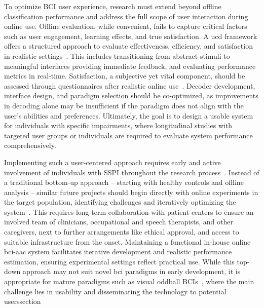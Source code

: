\documentclass{article}
\begin{document}
To optimize BCI user experience, research must extend beyond offline classification
performance and address the full scope of user interaction during online use.
Offline evaluation, while convenient, fails to capture critical factors such as
user engagement, learning effects, and true satisfaction.
A \ac{ucd} framework offers a structured approach to evaluate
effectiveness, efficiency, and satisfaction in realistic
settings~\cite{Standardization2009,Schreuder2013,Kuebler2014,Han2022}.
This includes transitioning from abstract stimuli to meaningful interfaces
providing immediate feedback, and evaluating performance metrics in real-time.
Satisfaction, a subjective yet vital component, should be assessed through
questionnaires after realistic online use~\cite{Kuebler2014}.
Decoder development, interface design, and paradigm selection should be
co-optimized, as improvements in decoding alone may be insufficient if the
paradigm does not align with the user’s abilities and preferences.
Ultimately, the goal is to design a usable system for individuals with
specific impairments, where longitudinal studies with targeted user groups or
individuals are required to evaluate system performance comprehensively.

Implementing such a user-centered approach requires early and active involvement
of individuals with SSPI throughout the research process~\cite{Standardization2009}.
Instead of a traditional bottom-up approach -- starting with healthy controls and
offline analysis -- similar future projects should begin directly with online experiments
in the target population, identifying challenges and iteratively optimizing the
system~\cite{FriedOken2020}.
This requires long-term collaboration with patient centers to ensure an involved
team of clinicians, occupational and speech therapists, and other caregivers, next to
further arrangements like ethical approval, and access to suitable infrastructure
from the onset.
Maintaining a functional in-house online \ac{bci}-\ac{aac} system facilitates iterative
development and realistic performance estimation, ensuring experimental settings
reflect practical use.
While this top-down approach may not suit novel \ac{bci} paradigms in early
development, it is appropriate for mature paradigms such as visual oddball
BCIs~\cite{Pan2022,Fouad2020}, where the main challenge lies in usability and
disseminating the technology to potential userssection

\acresetall%
\end{document}
